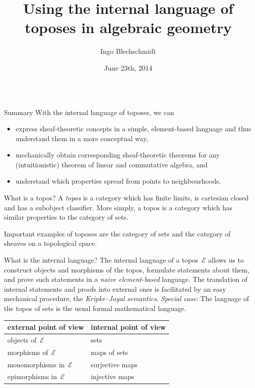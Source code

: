 \documentclass[table]{beamer}
\title{Using the internal language of toposes in algebraic geometry}
\author{Ingo Blechschmidt}
\institute{University of Augsburg}
\date{June 23th, 2014}
\newcommand{\E}{\mathcal{E}}
\begin{document}
\begin{frame}[t]\begin{columns}[t]

\begin{column}{0.3\textwidth}
  \begin{alertblock}{Summary}
    With the internal language of toposes, we can
    \begin{itemize}\justifying
    \item express sheaf-theoretic
    concepts in a simple, ele\-ment-ba\-sed language and thus understand them
    in a more conceptual way,
    \item mechanically obtain
    corresponding sheaf-theo\-re\-tic theorems for any (intuitionistic) theorem of
    linear and commutative algebra, and
    \item understand which properties spread from
    points to neighbourhoods.
    \end{itemize}
  \end{alertblock}
  \bigskip

  \begin{block}{What is a topos?}
    A \emph{topos} is a category which has finite limits, is cartesian closed and
    has a subobject classifier. More simply, a topos is a category which has
    similar properties to the category of sets.\medskip

    Important examples of toposes are
    the category of sets and
    the category of sheaves on a topological space.
  \end{block}
  \bigskip

  \begin{block}{What is the internal language?}
    The internal language of a topos~$\E$ allows us to
    construct objects and morphisms of the topos,
    formulate statements about them, and
    prove such statements
    in a \emph{naive element-based} language.
    The translation of internal statements and proofs into external ones is
    facilitated by an easy mechanical procedure, the \emph{Kripke--Joyal
    semantics}.
    \emph{Special case:} The language of the topos of sets is the usual
    formal mathematical language.

    \begin{center}
      \begin{tabular}{ll}
        \toprule
        external point of view & internal point of view \\
        \midrule
        objects of~$\E$ & sets \\
        morphisms of~$\E$ & maps of sets \\
        monomorphisms in~$\E$ & surjective maps \\
        epimorphisms in~$\E$ & injective maps \\
        \bottomrule
      \end{tabular}
    \end{center}
  \end{block}


\end{column}
\end{columns}
\end{frame}
\end{document}
